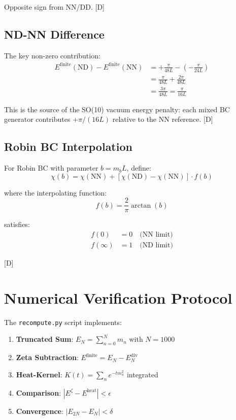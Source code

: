 \documentclass[11pt,a4paper]{article}
\newcommand{\tagD}{\textcolor{blue!70!black}{[D]}}
\begin{document}
Opposite sign from NN/DD. \tagD

\subsection{ND-NN Difference}

The key non-zero contribution:
\begin{align}
\label{eq:app-ND-NN-diff-1}
E^{\text{finite}}(\text{ND}) - E^{\text{finite}}(\text{NN}) &=
+\frac{\pi}{48L} - \left(-\frac{\pi}{24L}\right) \\
\label{eq:app-ND-NN-diff-2}
&= \frac{\pi}{48L} + \frac{2\pi}{48L} \\
\label{eq:app-ND-NN-diff-3}
&= \frac{3\pi}{48L} = \frac{\pi}{16L}
\end{align}

This is the source of the SO(10) vacuum energy penalty: each mixed BC generator
contributes $+\pi/(16L)$ relative to the NN reference. \tagD

\subsection{Robin BC Interpolation}

For Robin BC with parameter $b = m_b L$, define:
\begin{equation}
\label{eq:robin-chi}
\chi(b) = \chi(\text{NN}) + [\chi(\text{ND}) - \chi(\text{NN})] \cdot f(b)
\end{equation}

where the interpolating function:
\begin{equation}
\label{eq:robin-interp}
f(b) = \frac{2}{\pi} \arctan(b)
\end{equation}

satisfies:
\begin{align}
\label{eq:robin-f0}
f(0) &= 0 \quad \text{(NN limit)} \\
\label{eq:robin-finf}
f(\infty) &= 1 \quad \text{(ND limit)}
\end{align}

\tagD

\section{Numerical Verification Protocol}
\label{app:numerical}

The \texttt{recompute.py} script implements:

\begin{enumerate}
    \item \textbf{Truncated Sum}: $E_N = \sum_{n=0}^{N} m_n$ with $N = 1000$
    \item \textbf{Zeta Subtraction}: $E^{\text{finite}} = E_N - E_N^{\text{div}}$
    \item \textbf{Heat-Kernel}: $K(t) = \sum_n e^{-t m_n^2}$ integrated
    \item \textbf{Comparison}: $|E^{\zeta} - E^{\text{heat}}| < \epsilon$
    \item \textbf{Convergence}: $|E_{2N} - E_N| < \delta$
\end{enumerate}
\end{document}
